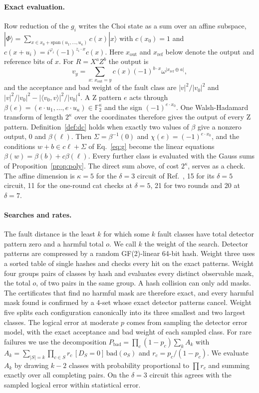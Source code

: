 \documentclass[aps,prl,reprint,twocolumn,amsmath,amssymb,floatfix,nofootinbib,superscriptaddress]{revtex4-2}
\theoremstyle{definition}
\theoremstyle{remark}
\newcommand{\F}{\mathbb F_2}
\begin{document}
\paragraph*{Exact evaluation.}
Row reduction of the $g_i$ writes the Choi state as a sum over an affine subspace, $|\Phi\rangle=\sum_{x\in x_0+\mathrm{span}(u_1,\dots,u_\kappa)}c(x)|x\rangle$ with $c(x_0)=1$ and $c(x+u_i)=i^{\varphi_i}(-1)^{z_i\cdot x}c(x)$. Here $x_{\mathrm{out}}$ and $x_{\mathrm{ref}}$ below denote the output and reference bits of $x$. For $R=X^aZ^b$ the output is
\begin{equation}
 v_y=\sum_{x:\,x_{\mathrm{out}}=y}c(x)(-1)^{b\cdot x}\omega^{|x_{\mathrm{ref}}\oplus a|},
\end{equation}
and the acceptance and bad weight of the fault class are $|v|^2/|v_0|^2$ and $|v|^2/|v_0|^2-|\langle v_0,v\rangle|^2/|v_0|^4$. A Z pattern $e$ acts through $\beta(e)=(e\cdot u_1,\dots,e\cdot u_\kappa)\in\F^\kappa$ and the sign $(-1)^{e\cdot x_0}$. One Walsh-Hadamard transform of length $2^\kappa$ over the coordinates therefore gives the output of every Z pattern. Definition~\ref{def:dc} holds when exactly two values of $\beta$ give a nonzero output, $0$ and $\beta(\ell)$. Then $\Sigma=\beta^{-1}(0)$ and $\chi(e)=(-1)^{e\cdot x_0}$, and the conditions $w+b\in c\ell+\Sigma$ of Eq.~\eqref{eq:g} become the linear equations $\beta(w)=\beta(b)+c\beta(\ell)$. Every further class is evaluated with the Gauss sums of Proposition~\ref{prop:poly}. The direct sum above, of cost $2^\kappa$, serves as a check. The affine dimension is $\kappa=5$ for the $\delta=3$ circuit of Ref.~\cite{cultivation}, 15 for its $\delta=5$ circuit, 11 for the one-round cat checks at $\delta=5$, 21 for two rounds and 20 at $\delta=7$.

\paragraph*{Searches and rates.}
The fault distance is the least $k$ for which some $k$ fault classes have total detector pattern zero and a harmful total $o$. We call $k$ the weight of the search. Detector patterns are compressed by a random GF(2)-linear 64-bit hash. Weight three uses a sorted table of single hashes and checks every hit on the exact patterns. Weight four groups pairs of classes by hash and evaluates every distinct observable mask, the total $o$, of two pairs in the same group. A hash collision can only add masks. The certificates that find no harmful mask are therefore exact, and every harmful mask found is confirmed by a 4-set whose exact detector patterns cancel. Weight five splits each configuration canonically into its three smallest and two largest classes. The logical error at moderate $p$ comes from sampling the detector error model, with the exact acceptance and bad weight of each sampled class. For rare failures we use the decomposition $P_{\mathrm{bad}}=\prod_c(1-p_c)\sum_kA_k$ with $A_k=\sum_{|S|=k}\prod_{c\in S}r_c\,[D_S=0]\,\mathrm{bad}(o_S)$ and $r_c=p_c/(1-p_c)$. We evaluate $A_k$ by drawing $k-2$ classes with probability proportional to $\prod r_c$ and summing exactly over all completing pairs. On the $\delta=3$ circuit this agrees with the sampled logical error within statistical error.
\end{document}
